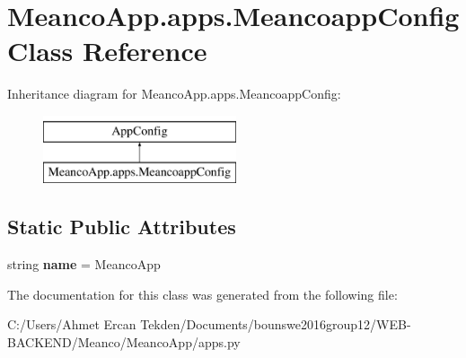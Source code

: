 \hypertarget{class_meanco_app_1_1apps_1_1_meancoapp_config}{}\section{Meanco\+App.\+apps.\+Meancoapp\+Config Class Reference}
\label{class_meanco_app_1_1apps_1_1_meancoapp_config}
Inheritance diagram for Meanco\+App.\+apps.\+Meancoapp\+Config\+:\begin{figure}[H]
\begin{center}
\leavevmode
\includegraphics[height=2.000000cm]{class_meanco_app_1_1apps_1_1_meancoapp_config}
\end{center}
\end{figure}
\subsection*{Static Public Attributes}
\begin{DoxyCompactItemize}
\item 
\hypertarget{class_meanco_app_1_1apps_1_1_meancoapp_config_aa8d70241f6148d85caca233c30ef650e}{}\label{class_meanco_app_1_1apps_1_1_meancoapp_config_aa8d70241f6148d85caca233c30ef650e} 
string {\bfseries name} = \textquotesingle{}Meanco\+App\textquotesingle{}
\end{DoxyCompactItemize}


The documentation for this class was generated from the following file\+:\begin{DoxyCompactItemize}
\item 
C\+:/\+Users/\+Ahmet Ercan Tekden/\+Documents/bounswe2016group12/\+W\+E\+B-\/\+B\+A\+C\+K\+E\+N\+D/\+Meanco/\+Meanco\+App/apps.\+py\end{DoxyCompactItemize}
